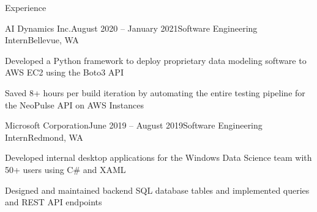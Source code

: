 \documentclass{resume} %
\begin{document}
\begin{rSection}{Experience}
\begin{rSubsection}{AI Dynamics Inc.}{August 2020 – January 2021}{Software Engineering Intern}{Bellevue, WA}
    \item Developed a Python framework to deploy proprietary data modeling software to AWS EC2 using the Boto3 API
    \item Saved 8+ hours per build iteration by automating the entire testing pipeline for the NeoPulse API on AWS Instances
\end{rSubsection}

\begin{rSubsection}{Microsoft Corporation}{June 2019 – August 2019}{Software Engineering Intern}{Redmond, WA}
    \item Developed internal desktop applications for the Windows Data Science team with 50+ users using C\# and XAML
    \item Designed and maintained backend SQL database tables and implemented queries and REST API endpoints
\end{rSubsection}

\end{rSection}

\end{document}
